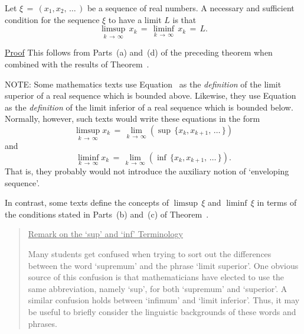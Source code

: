 {        Let ${\xi} \,=\, (x_{1},x_{2},\,{\ldots}\,)$ be a sequence of real numbers.
    A necessary and sufficient condition for the sequence ${\xi}$ to have a limit $L$ is that
        \begin{displaymath}
        {\limsup}_{k \,{\rightarrow}\, {\infty}}\,x_{k} \,=\, {\liminf}_{k \,{\rightarrow}\, {\infty}}\, x_{k} \,=\, L.
        \end{displaymath}


        \underline{Proof} This follows from Parts~(a) and~(d) of the preceding theorem when combined with the results of Theorem~.


\V

        NOTE: Some mathematics texts use Equation~ as the {\em definition} of the limit superior of a real sequence which is bounded above.
    Likewise, they use Equation~ as the {\em definition} of the limit inferior of a real sequence which is bounded below.
    Normally, however, such texts would write these equations in the form
        \begin{displaymath}
        \limsup_{k \,{\rightarrow}\, {\infty}} x_{k} \,=\, \lim_{k \,{\rightarrow}\, {\infty}} \left({\sup}\,\{x_{k},x_{k+1},\,{\ldots}\,\}\right)
        \end{displaymath}
    and
        \begin{displaymath}
        \liminf_{k \,{\rightarrow}\, {\infty}} x_{k} \,=\, \lim_{k \,{\rightarrow}\, {\infty}} \left({\inf}\,\{x_{k},x_{k+1},\,{\ldots}\,\}\right). 
        \end{displaymath}
    That is, they probably would not introduce the auxiliary notion of `enveloping sequence'.

        In contrast, some texts define the concepts of ${\limsup\, {\xi}}$ and $\liminf\, {\xi}$ in terms of the conditions stated in Parts~(b) and~(c) of Theorem~.

\V
\V

\begin{quotation}
{\footnotesize \underline{Remark on the `sup' and `inf' Terminology}

        Many students get confused when trying to sort out the differences between the word `supremum' and the phrase `limit superior'.
    One obvious source of this confusion is that mathematicians have elected to use the same abbreviation, namely `sup', for both `supremum' and `superior'.
    A similar confusion holds between `infimum' and `limit inferior'.
    Thus, it may be useful to briefly consider the linguistic backgrounds of these words and phrases.

}
\end{quotation}}
